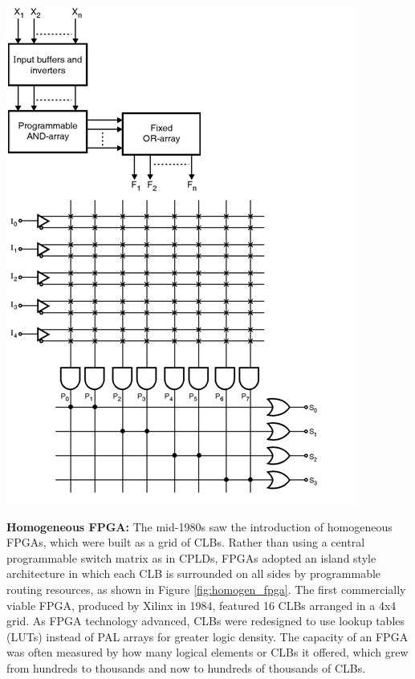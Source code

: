 {
    \centering
    \includegraphics[width=\columnwidth]{figures/pal_2.png}
    \label{fig:pal_2}
}

\newcolumn

\textbf{Homogeneous FPGA:} \quad 
The mid-1980s saw the introduction of homogeneous FPGAs, which were built as a grid of CLBs. 
Rather than using a central programmable switch matrix as in CPLDs, FPGAs adopted an island style architecture in which each CLB is surrounded on all sides by programmable routing resources, as shown in Figure \ref{fig:homogen_fpga}. 
The first commercially viable FPGA, produced by Xilinx in 1984, featured 16 CLBs arranged in a 4x4 grid. 
As FPGA technology advanced, CLBs were redesigned to use lookup tables (LUTs) instead of PAL arrays for greater logic density. 
The capacity of an FPGA was often measured by how many logical elements or CLBs it offered, which grew from hundreds to thousands and now to hundreds of thousands of CLBs.
\\ 

